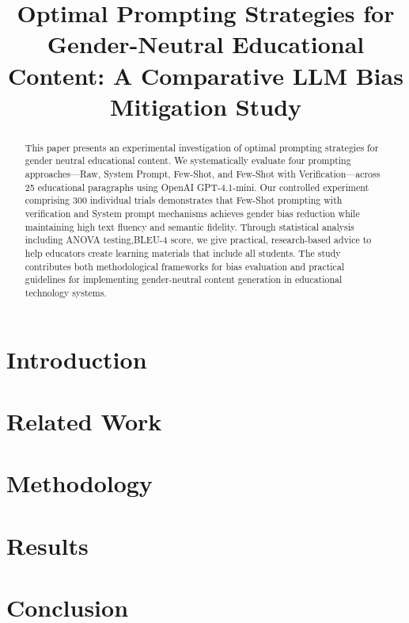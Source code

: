 \documentclass[conference]{IEEEtran}
\begin{document}
\title{Optimal Prompting Strategies for Gender-Neutral Educational Content: A Comparative LLM Bias Mitigation Study
}

\author{
\and
{}
}

\maketitle

\begin{abstract}
This paper presents an experimental investigation of optimal prompting strategies for gender neutral educational content. We systematically evaluate four prompting approaches—Raw, System Prompt, Few-Shot, and Few-Shot with Verification—across 25 educational paragraphs using OpenAI GPT-4.1-mini. Our controlled experiment comprising 300 individual trials demonstrates that Few-Shot prompting with verification and System prompt mechanisms achieves gender bias reduction while maintaining high text fluency and semantic fidelity. Through statistical analysis including ANOVA testing,BLEU-4 score, we give practical, research-based advice to help educators create learning materials that include all students. The study contributes both methodological frameworks for bias evaluation and practical guidelines for implementing gender-neutral content generation in educational technology systems.
\end{abstract}

\section{Introduction}


\section{Related Work}


\section{Methodology}


\section{Results}


\section{Conclusion}


\appendix




\end{document}
